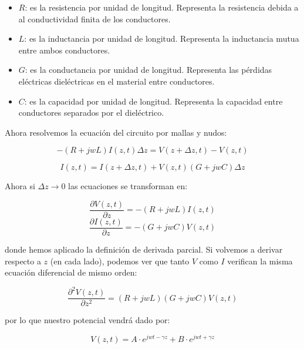 \documentclass[12pt]{article}
\newcommand{\parciales}[2]{\frac{\partial #1}{\partial #2}}
\begin{document}
\begin{itemize}
\item $R$: es la resistencia por unidad de longitud. Representa la resistencia debida a al conductividad finita de los conductores.

\item $L$: es la inductancia por unidad de longitud. Representa la inductancia mutua entre ambos conductores. 

\item $G$: es la conductancia por unidad de longitud. Representa las pérdidas eléctricas dieléctricas en el material entre conductores.

\item $C$: es la capacidad por unidad de longitud. Representa la capacidad entre conductores separados por el dieléctrico.
\end{itemize}
 
Ahora resolvemos la ecuación del circuito por mallas y nudos:

\begin{equation}
-(R+jwL)I(z,t)\Delta z = V(z+\Delta z,t) - V(z,t)  \label{Ec:8.1-001}
\end{equation}

\begin{equation}
I(z,t)= I(z+\Delta z,t) + V(z,t)(G+jwC) \Delta z \label{Ec:8.1-002}
\end{equation}

Ahora si $\Delta z \rightarrow 0$ las ecuaciones se transforman en:

\begin{equation}
\parciales{V(z,t)}{z} = - (R+jwL)I(z,t)
\end{equation}
\begin{equation}
\parciales{I(z,t)}{z} = - (G+jwC)V(z,t)
\end{equation}
 
donde hemos aplicado la definición de derivada parcial. Si volvemos a derivar respecto a $z$ (en cada lado), podemos ver que tanto $V$ como $I$ verifican la misma ecuación diferencial de mismo orden:

\begin{equation}
\parciales{^2 V(z,t)}{z^2} = (R+jwL)(G+jwC)V(z,t)
\end{equation}
 
por lo que nuestro potencial vendrá dado por:

\begin{equation}
V(z,t) = A \cdot e^{jwt-\gamma z} + B \cdot e^{jwt + \gamma z}
\end{equation}
\end{document}
